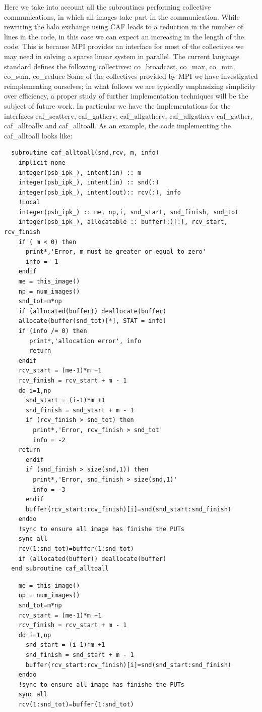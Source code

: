 \documentclass{IOS-Book-Article}
\begin{document}
Here we take into account all the subroutines performing collective
communications, in which all images take part in the
communication. While rewriting the halo exchange using CAF leads to a
reduction in the number of lines in the code, in this case we can
expect an increasing in the length of the code. This is because MPI
provides an interface for most of the collectives we may need in
solving a sparse linear system in parallel.
The current language standard defines the following collectives: co\_broadcast, co\_max, co\_min, co\_sum, co\_reduce
Some of the collectives provided by MPI  we have investigated
reimplementing ourselves; in what follows we are typically emphasizing
simplicity over efficiency, a proper study of further implementation
techniques will be the subject of future work. In particular 
we have the implementations for the interfaces caf\_scatterv,
caf\_gatherv, caf\_allgatherv, caf\_allgatherv caf\_gather,
caf\_alltoallv and caf\_alltoall.  
As an example, the code implementing the caf\_alltoall looks like:
\lstset{language=Fortran} 
\iffalse
{\small
\begin{lstlisting}
  subroutine caf_alltoall(snd,rcv, m, info)
    implicit none
    integer(psb_ipk_), intent(in) :: m
    integer(psb_ipk_), intent(in) :: snd(:)
    integer(psb_ipk_), intent(out):: rcv(:), info
    !Local
    integer(psb_ipk_) :: me, np,i, snd_start, snd_finish, snd_tot
    integer(psb_ipk_), allocatable :: buffer(:)[:], rcv_start, rcv_finish
    if ( m < 0) then
      print*,'Error, m must be greater or equal to zero'
      info = -1
    endif
    me = this_image()
    np = num_images()
    snd_tot=m*np
    if (allocated(buffer)) deallocate(buffer)
    allocate(buffer(snd_tot)[*], STAT = info)
    if (info /= 0) then
       print*,'allocation error', info
       return
    endif
    rcv_start = (me-1)*m +1
    rcv_finish = rcv_start + m - 1
    do i=1,np
      snd_start = (i-1)*m +1 
      snd_finish = snd_start + m - 1
      if (rcv_finish > snd_tot) then
        print*,'Error, rcv_finish > snd_tot'
        info = -2 
	return
      endif
      if (snd_finish > size(snd,1)) then
        print*,'Error, snd_finish > size(snd,1)'
        info = -3 
      endif
      buffer(rcv_start:rcv_finish)[i]=snd(snd_start:snd_finish)
    enddo
    !sync to ensure all image has finishe the PUTs 
    sync all
    rcv(1:snd_tot)=buffer(1:snd_tot)
    if (allocated(buffer)) deallocate(buffer)
  end subroutine caf_alltoall
\end{lstlisting}}
\else
{\small
\begin{lstlisting}
    me = this_image()
    np = num_images()
    snd_tot=m*np
    rcv_start = (me-1)*m +1
    rcv_finish = rcv_start + m - 1
    do i=1,np
      snd_start = (i-1)*m +1 
      snd_finish = snd_start + m - 1
      buffer(rcv_start:rcv_finish)[i]=snd(snd_start:snd_finish)
    enddo
    !sync to ensure all image has finishe the PUTs 
    sync all
    rcv(1:snd_tot)=buffer(1:snd_tot)
\end{lstlisting}}
\end{document}
